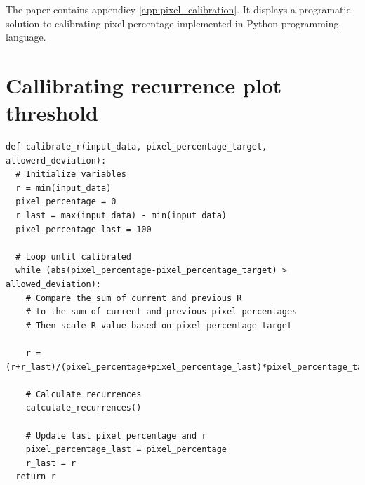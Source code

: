\documentclass[a4paper,12pt,fleqn]{article}
\begin{document}






\newpage
{}






\newpage
\begin{appendices}
  The paper contains appendicy \ref{app:pixel_calibration}. It displays a programatic solution to calibrating pixel percentage implemented in Python programming language.
  \newpage
  \section{Callibrating recurrence plot threshold }
  \begin{lstlisting}[caption={Pixel percentage calibration}]
def calibrate_r(input_data, pixel_percentage_target, allowerd_deviation):
  # Initialize variables
  r = min(input_data)
  pixel_percentage = 0
  r_last = max(input_data) - min(input_data)
  pixel_percentage_last = 100

  # Loop until calibrated
  while (abs(pixel_percentage-pixel_percentage_target) > allowed_deviation):
    # Compare the sum of current and previous R
    # to the sum of current and previous pixel percentages
    # Then scale R value based on pixel percentage target

    r = (r+r_last)/(pixel_percentage+pixel_percentage_last)*pixel_percentage_target
    
    # Calculate recurrences
    calculate_recurrences()

    # Update last pixel percentage and r
    pixel_percentage_last = pixel_percentage
    r_last = r
  return r
  \end{lstlisting}
  \label{app:pixel_calibration}

\end{appendices}
\end{document}
